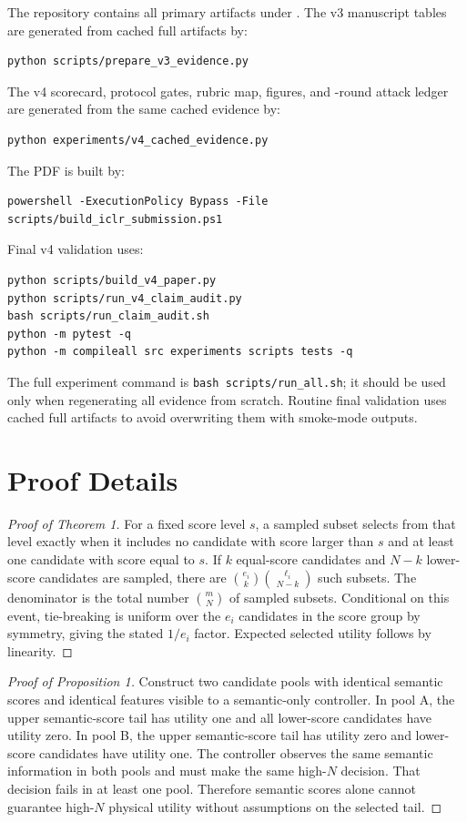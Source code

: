 \documentclass{article}
\begin{document}
The repository contains all primary artifacts under . The v3 manuscript tables are generated from cached full artifacts by:
\begin{verbatim}
python scripts/prepare_v3_evidence.py
\end{verbatim}
The v4 scorecard, protocol gates, rubric map, figures, and \VFourAttackRounds{}-round attack ledger are generated from the same cached evidence by:
\begin{verbatim}
python experiments/v4_cached_evidence.py
\end{verbatim}
The PDF is built by:
\begin{verbatim}
powershell -ExecutionPolicy Bypass -File
scripts/build_iclr_submission.ps1
\end{verbatim}
Final v4 validation uses:
\begin{verbatim}
python scripts/build_v4_paper.py
python scripts/run_v4_claim_audit.py
bash scripts/run_claim_audit.sh
python -m pytest -q
python -m compileall src experiments scripts tests -q
\end{verbatim}
The full experiment command is \texttt{bash scripts/run\_all.sh}; it should be used only when regenerating all evidence from scratch. Routine final validation uses cached full artifacts to avoid overwriting them with smoke-mode outputs.

\label{page:maintextend}



\appendix

\section{Proof Details}

\begin{proof}[Proof of Theorem 1]
For a fixed score level $s$, a sampled subset selects from that level exactly when it includes no candidate with score larger than $s$ and at least one candidate with score equal to $s$. If $k$ equal-score candidates and $N-k$ lower-score candidates are sampled, there are $\binom{e_i}{k}\binom{\ell_i}{N-k}$ such subsets. The denominator is the total number $\binom{m}{N}$ of sampled subsets. Conditional on this event, tie-breaking is uniform over the $e_i$ candidates in the score group by symmetry, giving the stated $1/e_i$ factor. Expected selected utility follows by linearity.
\end{proof}

\begin{proof}[Proof of Proposition 1]
Construct two candidate pools with identical semantic scores and identical features visible to a semantic-only controller. In pool A, the upper semantic-score tail has utility one and all lower-score candidates have utility zero. In pool B, the upper semantic-score tail has utility zero and lower-score candidates have utility one. The controller observes the same semantic information in both pools and must make the same high-$N$ decision. That decision fails in at least one pool. Therefore semantic scores alone cannot guarantee high-$N$ physical utility without assumptions on the selected tail.
\end{proof}
\end{document}
